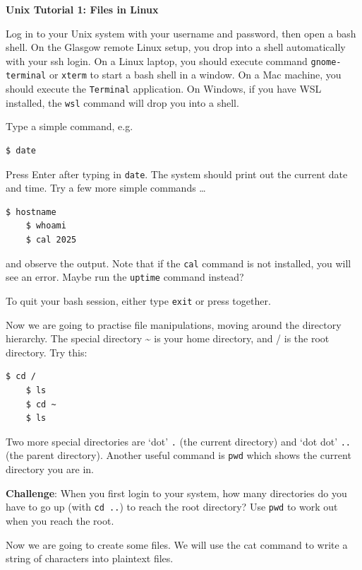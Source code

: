 \documentclass{article}
\begin{document}
\noindent
{\Large \textsf{\textbf{Unix Tutorial 1: Files in Linux}}}

\bigskip


Log in to your Unix system with your username and password, then
open a bash shell. On the Glasgow remote Linux setup, you drop into a shell automatically with your ssh login. On a Linux laptop, you should execute command \texttt{gnome-terminal} or \texttt{xterm} to start a bash shell in a window. On a Mac machine, you should execute the \texttt{Terminal} application. On Windows, if you have WSL installed, the \texttt{wsl} command will drop you into a shell.

Type a simple command, e.g.\
\begin{lstlisting}[style=BashInputStyle]
    $ date
\end{lstlisting}
Press Enter after typing in \lstinline{date}. The system should print out the current date and time.
Try a few more simple commands \ldots
\begin{lstlisting}[style=BashInputStyle]
    $ hostname
    $ whoami
    $ cal 2025
\end{lstlisting}

and observe the output.
Note that if the \texttt{cal} command is not installed, you
will see an error. Maybe run the \texttt{uptime} command instead?

To quit your bash session, either type \lstinline{exit} or press
\keys{\ctrl + D} together.




Now we are going to practise file manipulations, moving around the directory hierarchy. The special directory \~{} is your home directory, and / is the root directory. Try this:


\begin{lstlisting}[style=BashInputStyle]
    $ cd /
    $ ls
    $ cd ~
    $ ls
\end{lstlisting}

Two more special directories are `dot' \texttt{.} (the current directory)  and `dot dot' \texttt{..} (the parent directory). Another useful command is \texttt{pwd} which shows the current directory you are in.

\textbf{Challenge}: When you first login to your system, how many directories do you have to go up (with \texttt{cd ..}) to reach the root directory? Use \texttt{pwd} to work out when you reach the root.

Now we are going to create some files. We will use the cat command to write a string of characters into plaintext files.
\end{document}
